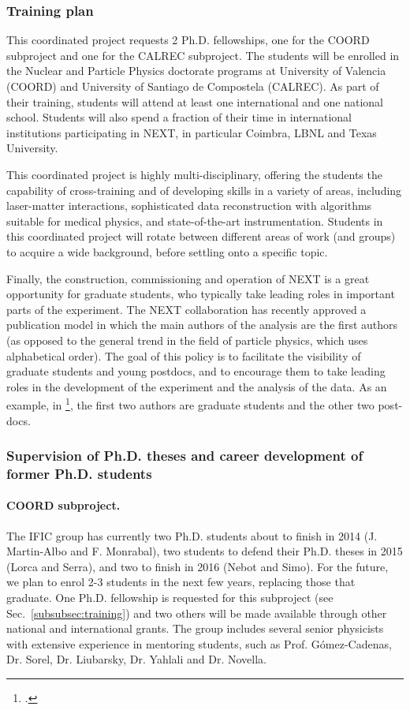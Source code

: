 \subsubsection{\label{subsubsec:training}Training plan}

This coordinated project requests 2 Ph.D. fellowships, one for the COORD subproject and one for the CALREC subproject. The students will be enrolled in the Nuclear and Particle Physics doctorate programs at University of Valencia (COORD) and University of Santiago de Compostela (CALREC). As part of their training, students will attend at least one international and one national school. Students will also spend a fraction of their time in international institutions participating in NEXT, in particular Coimbra, LBNL and Texas University. 

This coordinated project is highly multi-disciplinary, offering the students the capability of cross-training and of developing skills in a variety of areas, including laser-matter interactions, sophisticated data reconstruction with algorithms suitable for medical physics, and state-of-the-art instrumentation. Students in this coordinated project will rotate between different areas of work (and groups) to acquire a wide background, before settling onto a specific topic. 

Finally, the construction, commissioning and operation of NEXT is a great opportunity for graduate students, who typically take leading roles in important parts of the experiment. The NEXT collaboration has recently approved a publication model in which the main authors of the analysis are the first authors (as opposed to the general trend in the field of particle physics, which uses alphabetical order). The goal of this policy is to facilitate the visibility of graduate students and young postdocs, and to encourage them to take leading roles in the development of the experiment and the analysis of the data. As an example, in \footcite{Lorca:2014sra}, the first two authors are graduate students and the other two post-docs.



\subsubsection{Supervision of Ph.D. theses and career development of former Ph.D. students}

\paragraph{COORD subproject.}
The IFIC group has currently two Ph.D. students about to finish in 2014 (J. Martin-Albo and F. Monrabal), two students to defend their Ph.D. theses in 2015 (Lorca and Serra), and two to finish in 2016 (Nebot and Simo). For the future, we plan to enrol 2-3 students in the next few years, replacing those that graduate. One Ph.D. fellowship is requested for this subproject (see Sec.~\ref{subsubsec:training}) and two others will be made available through other national and international grants. The group includes several senior physicists with extensive experience in mentoring students, such as Prof. G\'omez-Cadenas, Dr. Sorel, Dr. Liubarsky, Dr. Yahlali and Dr. Novella. 

